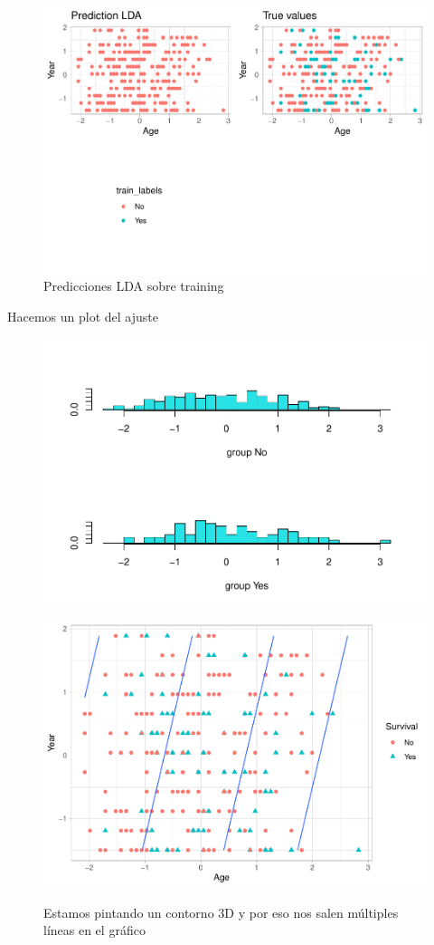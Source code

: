 \begin{figure}[H]\center\includegraphics[width=.9\linewidth]{img/Clasificacion_files/figure-latex/unnamed-chunk-22-1}\caption{Predicciones LDA sobre training}\end{figure}

Hacemos un plot del ajuste

\begin{figure}[H]\center\includegraphics[width=.9\linewidth]{img/Clasificacion_files/figure-latex/unnamed-chunk-23-1}\caption{}\end{figure}

\begin{figure}[H]\center\includegraphics[width=.9\linewidth]{img/Clasificacion_files/figure-latex/unnamed-chunk-24-1}\caption{}\small{Estamos pintando un contorno 3D y por eso nos salen múltiples líneas en el gráfico}\end{figure}

